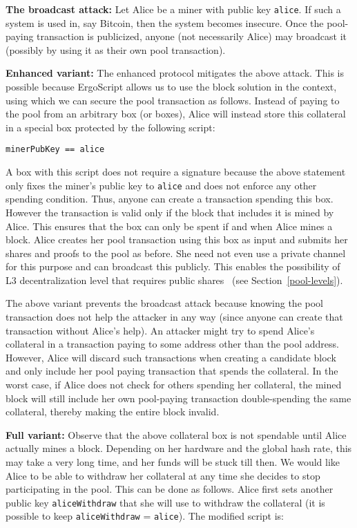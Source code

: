 \documentclass{llncs}
\newcommand{\langname}{ErgoScript\xspace}
\begin{document}
\textbf{The broadcast attack:} Let Alice be a miner with public key \texttt{alice}. If such a system is used in, say Bitcoin, then the system becomes insecure. Once the pool-paying transaction is publicized, anyone (not necessarily Alice) may broadcast it (possibly by using it as their own pool transaction). 

\textbf{Enhanced variant:} The enhanced protocol mitigates the above attack. This is possible because \langname allows us to use the block solution in the context, using which we can secure the pool transaction as follows. Instead of paying to the pool from an arbitrary box (or boxes), Alice will instead store this collateral in a special box protected by the following script:
\begin{verbatim}
minerPubKey == alice
\end{verbatim}

A box with this script does not require a signature because the above statement only fixes the miner's public key to \texttt{alice} and does not enforce any other spending condition. Thus, anyone can create a transaction spending this box. However the transaction is valid only if the block that includes it is mined by Alice. 
This ensures that the box can only be spent if and when Alice mines a block.  
Alice creates her pool transaction using this box as input and submits her shares and proofs to the pool as before. She need not even use a private channel for this purpose and can broadcast this publicly. This enables the possibility of L3 decentralization level that requires public shares~\cite{chesterman2018p2pool,luu2017smartpool} (see Section~\ref{pool-levels}).

The above variant prevents the broadcast attack because knowing the pool transaction does not help the attacker in any way (since anyone can create that transaction without Alice's help). An attacker might try to spend Alice's collateral in a transaction paying to some address other than the pool address. However, Alice will discard such transactions when creating a candidate block and only include her pool paying transaction that spends the collateral. In the worst case, if Alice does not check for others spending her collateral, the mined block will still include her own pool-paying transaction double-spending the same collateral, thereby making the entire block invalid. 

\textbf{Full variant:} Observe that the above collateral box is not spendable until Alice actually mines a block. Depending on her hardware and the global hash rate, this may take a very long time, and her funds will be stuck till then. We would like Alice to be able to withdraw her collateral at any time she decides to stop participating in the pool. This can be done as follows. Alice first sets another public key \texttt{aliceWithdraw} that she will use to withdraw the collateral (it is possible to keep \texttt{aliceWithdraw} = \texttt{alice}). The modified script is:
\end{document}
